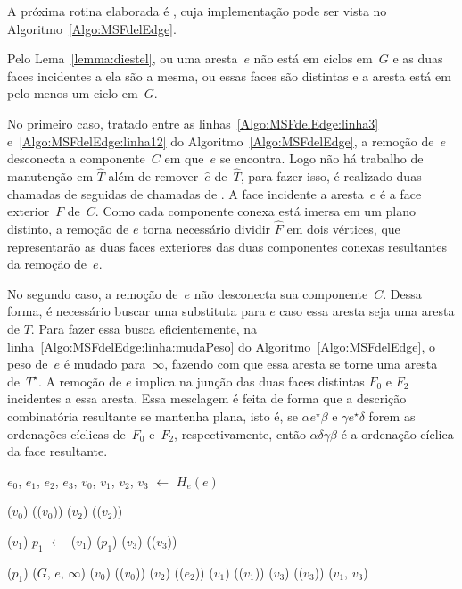 A próxima rotina elaborada é \MSFdelEdge{}, cuja implementação pode ser vista no Algoritmo~\ref{Algo:MSFdelEdge}.

Pelo Lema~\ref{lemma:diestel}, ou uma aresta~$e$ não está em ciclos em~$G$ e as duas faces incidentes a ela são a mesma, ou essas faces são distintas e a aresta está em pelo menos um ciclo em~$G$.

No primeiro caso, tratado entre as linhas~\ref{Algo:MSFdelEdge:linha3} e~\ref{Algo:MSFdelEdge:linha12} do Algoritmo~\ref{Algo:MSFdelEdge}, a remoção de~$e$ desconecta a componente~$C$ em que~$e$ se encontra.
Logo não há trabalho de manutenção em $\hat T$ além de remover~$\hat e$ de~$\hat T$, para fazer isso, é realizado 
duas chamadas de \LCOCycle{} seguidas de chamadas de \LCOSplit{}.
A face incidente a aresta~$e$ é a face exterior~$F$ de~$C$.
Como cada componente conexa está imersa em um plano distinto, a remoção de $e$ torna necessário dividir $\hat F$ em dois vértices, que representarão as duas faces exteriores das duas componentes conexas resultantes da remoção de~$e$.

No segundo caso, a remoção de~$e$ não desconecta sua componente~$C$.
Dessa forma, é necessário buscar uma substituta para $e$ caso essa aresta seja uma aresta de $T$.
Para fazer essa busca eficientemente, na linha~\ref{Algo:MSFdelEdge:linha:mudaPeso} do Algoritmo~\ref{Algo:MSFdelEdge}, o peso de~$e$ é mudado para~$\infty$, fazendo com que essa aresta se torne uma aresta de~$T^\star$. 
A remoção de $e$ implica na junção das duas faces distintas $F_0$ e $F_2$ incidentes a essa aresta.
Essa mesclagem é feita de forma que a descrição combinatória resultante se mantenha plana, isto é, se $\alpha e^\star \beta$ e $\gamma e^\star \delta$ forem as ordenações cíclicas de~$F_0$ e~$F_2$, respectivamente, então $\alpha \delta\gamma\beta$ é a ordenação cíclica da face resultante.

\begin{algorithm}[hbt]
\caption{\MSFdelEdge($G$, $e$)}
\label{Algo:MSFdelEdge}
\begin{algorithmic}[1]
\State $e_0$, $e_1$, $e_2$, $e_3$, $v_0$, $v_1$, $v_2$, $v_3$ $\gets$ $H_e(e)$

\State \LCOCycle($v_0$) \label{Algo:MSFdelEdge:linha3}
\State \LCOSplit(\LCOPredecessor($v_0$))
\State \LCOCycle($v_2$)
\State \LCOSplit(\LCOPredecessor($v_2$))

\State \LCOCycle($v_1$)
\State $p_1$ $\gets$ \LCOPredecessor($v_1$)
\State \LCOSplit($p_1$)
\State \LCOCycle($v_3$)
\State \LCOSplit(\LCOPredecessor($v_3$))

\State \LCOSplit($p_1$) \label{Algo:MSFdelEdge:linha12}
\Else
\State \MSFupdate($G$, $e$, $\infty$)\label{Algo:MSFdelEdge:linha:mudaPeso}
\State \LCOCycle($v_0$)
\State \LCOSplit(\LCOPredecessor($v_0$))
\State \LCOCycle($v_2$)
\State \LCOSplit(\LCOPredecessor($e_2$))
\State \LCOCycle($v_1$)
\State \LCOSplit(\LCOPredecessor($v_1$))
\State \LCOCycle($v_3$)
\State \LCOSplit(\LCOPredecessor($v_3$))
\State \LCOMerge($v_1$, $v_3$)
\EndIf
\end{algorithmic}
\end{algorithm}


